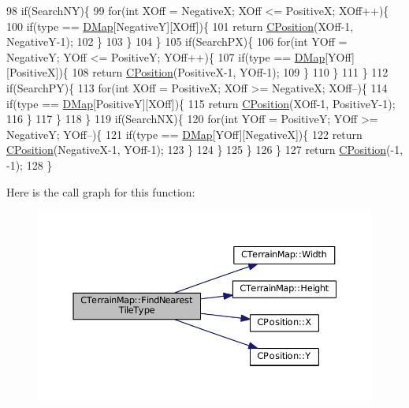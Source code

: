 \begin{DoxyCode}
98         \textcolor{keywordflow}{if}(SearchNY)\{
99             \textcolor{keywordflow}{for}(\textcolor{keywordtype}{int} XOff = NegativeX; XOff <= PositiveX; XOff++)\{
100                 \textcolor{keywordflow}{if}(type == \hyperlink{classCTerrainMap_a80d154ce478948b10473534a7bca13f6}{DMap}[NegativeY][XOff])\{
101                     \textcolor{keywordflow}{return} \hyperlink{classCPosition}{CPosition}(XOff-1, NegativeY-1);
102                 \}
103             \}
104         \}
105         \textcolor{keywordflow}{if}(SearchPX)\{
106             \textcolor{keywordflow}{for}(\textcolor{keywordtype}{int} YOff = NegativeY; YOff <= PositiveY; YOff++)\{
107                 \textcolor{keywordflow}{if}(type == \hyperlink{classCTerrainMap_a80d154ce478948b10473534a7bca13f6}{DMap}[YOff][PositiveX])\{
108                     \textcolor{keywordflow}{return} \hyperlink{classCPosition}{CPosition}(PositiveX-1, YOff-1);
109                 \}
110             \}
111         \}
112         \textcolor{keywordflow}{if}(SearchPY)\{
113             \textcolor{keywordflow}{for}(\textcolor{keywordtype}{int} XOff = PositiveX; XOff >= NegativeX; XOff--)\{
114                 \textcolor{keywordflow}{if}(type == \hyperlink{classCTerrainMap_a80d154ce478948b10473534a7bca13f6}{DMap}[PositiveY][XOff])\{
115                     \textcolor{keywordflow}{return} \hyperlink{classCPosition}{CPosition}(XOff-1, PositiveY-1);
116                 \}
117             \}
118         \}
119         \textcolor{keywordflow}{if}(SearchNX)\{
120             \textcolor{keywordflow}{for}(\textcolor{keywordtype}{int} YOff = PositiveY; YOff >= NegativeY; YOff--)\{
121                 \textcolor{keywordflow}{if}(type == \hyperlink{classCTerrainMap_a80d154ce478948b10473534a7bca13f6}{DMap}[YOff][NegativeX])\{
122                     \textcolor{keywordflow}{return} \hyperlink{classCPosition}{CPosition}(NegativeX-1, YOff-1);
123                 \}
124             \}
125         \}
126     \}
127     \textcolor{keywordflow}{return} \hyperlink{classCPosition}{CPosition}(-1, -1);
128 \}
\end{DoxyCode}
Here is the call graph for this function\+:
\nopagebreak
\begin{figure}[H]
\begin{center}
\leavevmode
\includegraphics[width=350pt]{classCTerrainMap_af32811cace3a3b01c9519b304ddb8efc_cgraph}
\end{center}
\end{figure}
